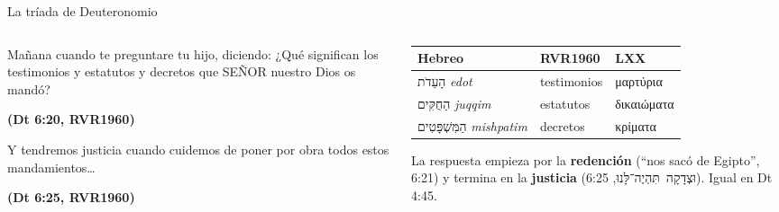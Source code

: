\documentclass[hyperref={bookmarks=false},aspectratio=169]{beamer}
\newcommand{\heb}[1]{\mbox{\foreignlanguage{hebrew}{#1}}}
\newcommand{\grc}[1]{\foreignlanguage{ancientgreek}{#1}}
\newcommand{\SENOR}{S{\fontsize{0.78em}{1em}\selectfont EÑOR}}
\newcommand{\fuente}[1]{\par\hfill{\upshape\bfseries\footnotesize\textcolor{azul}{#1}}}
\newcommand{\destacar}[1]{\textbf{\textcolor{azul}{#1}}}
\begin{document}
\begin{frame}{La tríada de Deuteronomio}
\begin{columns}[c,onlytextwidth]
\begin{column}{0.52\textwidth}
\begin{cita}Mañana cuando te preguntare tu hijo, diciendo: ¿Qué significan los testimonios y estatutos y decretos que \SENOR{} nuestro Dios os mandó?\fuente{(Dt 6:20, RVR1960)}\end{cita}
\begin{cita}Y tendremos justicia cuando cuidemos de poner por obra todos estos mandamientos\ldots\fuente{(Dt 6:25, RVR1960)}\end{cita}
\end{column}
\begin{column}{0.46\textwidth}
\scriptsize\renewcommand{\arraystretch}{1.15}
\begin{tabular}{@{}>{\RaggedRight\arraybackslash}p{1.7cm}>{\RaggedRight\arraybackslash}p{1.6cm}>{\RaggedRight\arraybackslash}p{1.7cm}@{}}
\toprule
\textbf{Hebreo} & \textbf{RVR1960} & \textbf{LXX} \\ \midrule
\heb{הָעֵדֹת} \emph{edot} & testimonios & \grc{μαρτύρια} \\
\heb{הַחֻקִּים} \emph{juqqim} & estatutos & \grc{δικαιώματα} \\
\heb{הַמִּשְׁפָּטִים} \emph{mishpatim} & decretos & \grc{κρίματα} \\
\bottomrule
\end{tabular}\par\smallskip
\small La respuesta empieza por la \destacar{redención} (``nos sacó de Egipto'', 6:21) y termina en la \destacar{justicia} (\heb{וּצְדָקָה תִּהְיֶה־לָּנוּ}, 6:25). Igual en Dt 4:45.
\end{column}
\end{columns}
\end{frame}
\end{document}
